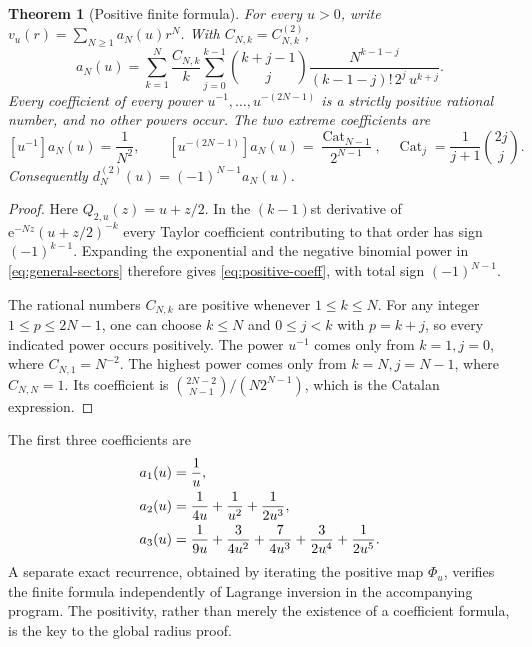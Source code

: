 \documentclass[11pt,a4paper]{article}
\newtheorem{theorem}{Theorem}[section]
\theoremstyle{definition}\newtheorem{definition}[theorem]{Definition}
\theoremstyle{remark}\newtheorem{remark}[theorem]{Remark}
\newcommand{\ee}{\mathrm e}
\numberwithin{equation}{section}
\begin{document}
\begin{theorem}[Positive finite formula]\label{thm:positive}
For every $u>0$, write
$v_u(r)=\sum_{N\ge1}a_N(u)r^N$. With $C_{N,k}=C^{(2)}_{N,k}$,
\begin{equation}\label{eq:positive-coeff}
 a_N(u)=\sum_{k=1}^N\frac{C_{N,k}}k
       \sum_{j=0}^{k-1}
       \binom{k+j-1}{j}
       \frac{N^{k-1-j}}{(k-1-j)!\,2^j\,u^{k+j}}.
\end{equation}
Every coefficient of every power $u^{-1},\ldots,u^{-(2N-1)}$ is a
strictly positive rational number, and no other powers occur. The two
extreme coefficients are
\begin{equation}\label{eq:extremes}
 [u^{-1}]a_N(u)=\frac1{N^2},\qquad
 [u^{-(2N-1)}]a_N(u)=\frac{\operatorname{Cat}_{N-1}}{2^{N-1}},
 \quad \operatorname{Cat}_{j}=\frac1{j+1}\binom{2j}{j}.
\end{equation}
Consequently $d_N^{(2)}(u)=(-1)^{N-1}a_N(u)$.
\end{theorem}
\begin{proof}
Here $Q_{2,u}(z)=u+z/2$. In the $(k-1)$st derivative of
$\ee^{-Nz}(u+z/2)^{-k}$ every Taylor coefficient contributing to that
order has sign $(-1)^{k-1}$. Expanding the exponential and the negative
binomial power in \eqref{eq:general-sectors} therefore gives
\eqref{eq:positive-coeff}, with total sign $(-1)^{N-1}$.

The rational numbers $C_{N,k}$ are positive whenever $1\le k\le N$.
For any integer $1\le p\le2N-1$, one can choose $k\le N$ and
$0\le j<k$ with $p=k+j$, so every indicated power occurs positively.
The power $u^{-1}$ comes only from $k=1,j=0$, where $C_{N,1}=N^{-2}$.
The highest power comes only from $k=N,j=N-1$, where $C_{N,N}=1$.
Its coefficient is
$\binom{2N-2}{N-1}/(N2^{N-1})$, which is the Catalan expression.
\end{proof}

The first three coefficients are
\begin{align}
 a_1(u)&=\frac1u,\notag\\
 a_2(u)&=\frac1{4u}+\frac1{u^2}+\frac1{2u^3},\label{eq:first-coeff}\\
 a_3(u)&=\frac1{9u}+\frac3{4u^2}+\frac7{4u^3}
                   +\frac3{2u^4}+\frac1{2u^5}.\notag
\end{align}
A separate exact recurrence, obtained by iterating the positive map
$\Phi_u$, verifies the finite formula independently of Lagrange inversion
in the accompanying program. The positivity, rather than merely the
existence of a coefficient formula, is the key to the global radius proof.
\end{document}
